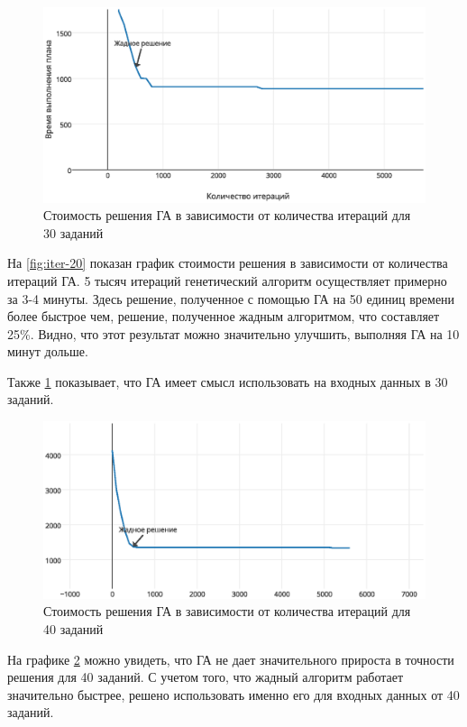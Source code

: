\documentclass[a4paper,14pt,russian]{article}
\begin{document}
\begin{figure}[here]
\includegraphics[scale=0.8]{images/iter-value-30-plot.eps}
\caption{Стоимость решения ГА в зависимости от количества итераций для 30 заданий}
\label{fig:iter-30}
\end{figure}
\pagebreak

На \cref{fig:iter-20} показан график стоимости решения в зависимости от количества итераций ГА. 5 тысяч итераций генетический алгоритм осуществляет примерно за 3-4 минуты. Здесь решение, полученное с помощью ГА на 50 единиц времени более быстрое чем, решение, полученное жадным алгоритмом, что составляет 25\%. Видно, что этот результат можно значительно улучшить, выполняя ГА на 10 минут дольше.

Также \cref{fig:iter-30} показывает, что ГА имеет смысл использовать на входных данных в 30 заданий.

\pagebreak
\begin{figure}[here]
\includegraphics[scale=0.8]{images/iter-value-50.eps}
\caption{Стоимость решения ГА в зависимости от количества итераций для 40 заданий}
\label{fig:iter-40}
\end{figure}

На графике \cref{fig:iter-40} можно увидеть, что ГА не дает значительного прироста в точности решения для 40 заданий. С учетом того, что жадный алгоритм работает значительно быстрее, решено использовать именно его для входных данных от 40 заданий.
\end{document}

